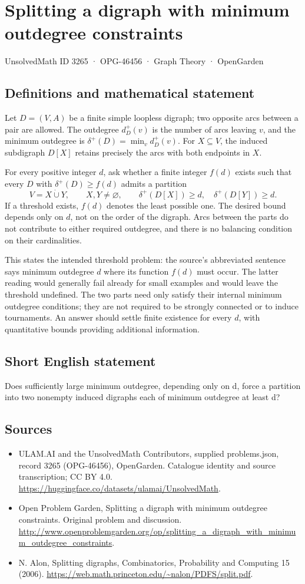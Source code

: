 \documentclass[11pt,a4paper]{article}
\begin{document}
\section*{Splitting a digraph with minimum outdegree constraints}\label{3265}
{\small UnsolvedMath ID 3265 · OPG-46456 · Graph Theory · OpenGarden}
\subsection{Definitions and mathematical statement}
Let $D=(V,A)$ be a finite simple loopless digraph; two opposite arcs between a pair are allowed. The outdegree $d_D^+(v)$ is the number of arcs leaving $v$, and the minimum outdegree is $\delta^+(D)=\min_vd_D^+(v)$. For $X\subseteq V$, the induced subdigraph $D[X]$ retains precisely the arcs with both endpoints in $X$.

For every positive integer $d$, ask whether a finite integer $f(d)$ exists such that every $D$ with $\delta^+(D)\ge f(d)$ admits a partition
\[
 V=X\mathbin{\dot\cup}Y,\qquad X,Y\ne\varnothing,
 \qquad\delta^+(D[X])\ge d,\quad\delta^+(D[Y])\ge d.
\]
If a threshold exists, $f(d)$ denotes the least possible one. The desired bound depends only on $d$, not on the order of the digraph. Arcs between the parts do not contribute to either required outdegree, and there is no balancing condition on their cardinalities.

This states the intended threshold problem: the source’s abbreviated sentence says minimum outdegree $d$ where its function $f(d)$ must occur. The latter reading would generally fail already for small examples and would leave the threshold undefined. The two parts need only satisfy their internal minimum outdegree conditions; they are not required to be strongly connected or to induce tournaments. An answer should settle finite existence for every $d$, with quantitative bounds providing additional information.
\subsection{Short English statement}
Does sufficiently large minimum outdegree, depending only on d, force a partition into two nonempty induced digraphs each of minimum outdegree at least d?
\subsection{Sources}
\begin{itemize}
\item[S1] ULAM.AI and the UnsolvedMath Contributors, supplied problems.json, record 3265 (OPG-46456), OpenGarden. Catalogue identity and source transcription; CC BY 4.0.
\url{https://huggingface.co/datasets/ulamai/UnsolvedMath}.
\item[S2] Open Problem Garden, Splitting a digraph with minimum outdegree constraints. Original problem and discussion.
\url{http://www.openproblemgarden.org/op/splitting_a_digraph_with_minimum_outdegree_constraints}.
\item[S3] N. Alon, Splitting digraphs, Combinatorics, Probability and Computing 15 (2006).
\url{https://web.math.princeton.edu/~nalon/PDFS/split.pdf}.
\end{itemize}
\end{document}
